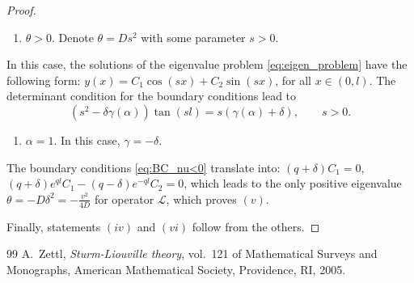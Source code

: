 \documentclass[10pt,a4paper]{amsart}
\begin{document}
\begin{proof}
\begin{enumerate}
    \item[3)] $\theta>0$. Denote $\theta=Ds^2$ with some parameter $s>0$.
\end{enumerate}
 In this case, the solutions of the eigenvalue problem \eqref{eq:eigen_problem} have the following form:
$y(x)=C_1\cos(sx)+C_2\sin(sx)$,
for all $x \in (0,l)$. 
The determinant condition for the 
boundary conditions lead to 
\begin{equation}\label{eq:for_s}
(s^2-\delta\gamma(\alpha))\tan(sl)=s(\gamma(\alpha)+\delta),\qquad s>0.
\end{equation}

\begin{enumerate}
    \item[4)] $\alpha=1$. In this case, $\gamma=-\delta$.
\end{enumerate}
The boundary conditions \eqref{eq:BC_nu<0} translate into:
$
(q+\delta)C_1=0$, $(q+\delta)e^{ql}C_1-(q-\delta)e^{-ql}C_2=0$,
which leads to the only positive eigenvalue $\theta=-D\delta^2=-\frac{v^2}{4D}$ for operator $\mathcal{L}$, which proves $(v)$.

Finally, statements $(iv)$ and $(vi)$ follow from the others.
\end{proof}

\begin{thebibliography}{99}
 {A.~Zettl}, {\em Sturm-{L}iouville theory}, vol.~121 of Mathematical Surveys and Monographs, American Mathematical Society, Providence, RI, 2005.
\end{thebibliography}
\end{document}
